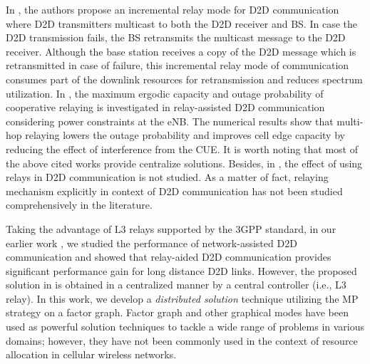 \documentclass[twocolumn,10pt]{IEEEtran}
\begin{document}
In \cite{d2d_inceremental_relay}, the authors  propose an incremental relay mode for D2D communication where D2D transmitters multicast to both the D2D receiver and BS. In case the D2D transmission fails, the BS retransmits
the multicast message to the D2D receiver. Although the base station receives a copy of the D2D message which is retransmitted in case of failure,  this incremental relay mode of communication consumes part of the downlink resources for retransmission and reduces spectrum utilization. In \cite{d2d-rel-1,  d2d_relay_2}, the maximum ergodic capacity and outage probability of cooperative relaying is investigated in relay-assisted D2D communication  considering power constraints at the eNB. The numerical results show that multi-hop relaying lowers the outage probability and improves cell edge capacity by reducing the effect of interference from the CUE. It is worth noting that most of the above cited works provide centralize solutions. Besides, in \cite{zul-d2d, d2d_new_paper, phond-d2d, d2d_swarm, d2d_multicast, d2d_intf_graph, le_d2d, d2d_inceremental_relay}, the effect of using relays in D2D communication is not studied. As a matter of fact, relaying mechanism explicitly in context of D2D communication has not been studied comprehensively in the literature. 

Taking the advantage of L3 relays supported by the 3GPP standard, in our earlier work \cite{d2d_our_paper}, we studied the performance of network-assisted D2D communication and showed that relay-aided D2D communication provides significant performance gain for long distance D2D links. However, the proposed solution in \cite{d2d_our_paper} is obtained in a centralized manner by a central controller (i.e., L3 relay). In this work, we develop a \textit{distributed solution} technique utilizing the MP strategy on a factor graph. Factor graph and other graphical modes have been used as powerful solution techniques to tackle a wide range of problems in various domains; however, they have not been commonly used in the context of resource allocation in cellular wireless networks. 
\end{document}
